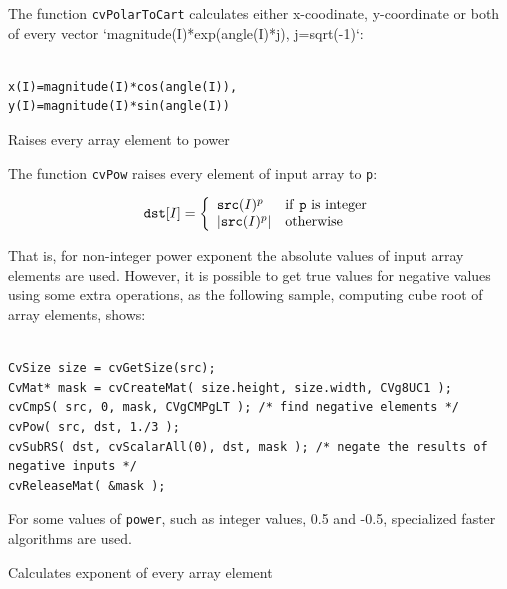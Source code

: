 The function \texttt{cvPolarToCart} calculates either x-coodinate, y-coordinate or both of every vector `magnitude(I)*exp(angle(I)*j), j=sqrt(-1)`:

\begin{lstlisting}

x(I)=magnitude(I)*cos(angle(I)),
y(I)=magnitude(I)*sin(angle(I))

\end{lstlisting}


\label{Pow}

Raises every array element to power


\begin{description}
\end{description}


The function \texttt{cvPow} raises every element of input array to \texttt{p}:

\[
\texttt{dst} [I] = \left\{ \begin{array}{l l} \texttt{src}(I)^p & \mbox{if \texttt{p} is integer}\\ |\texttt{src}(I)^p| & \mbox{otherwise}\\ \end{array} \right.
\]

That is, for non-integer power exponent the absolute values of input array elements are used. However, it is possible to get true values for negative values using some extra operations, as the following sample, computing cube root of array elements, shows:

\begin{lstlisting}

CvSize size = cvGetSize(src);
CvMat* mask = cvCreateMat( size.height, size.width, CVg8UC1 );
cvCmpS( src, 0, mask, CVgCMPgLT ); /* find negative elements */
cvPow( src, dst, 1./3 );
cvSubRS( dst, cvScalarAll(0), dst, mask ); /* negate the results of negative inputs */
cvReleaseMat( &mask );

\end{lstlisting}

For some values of \texttt{power}, such as integer values, 0.5 and -0.5, specialized faster algorithms are used.

\label{Exp}

Calculates exponent of every array element


